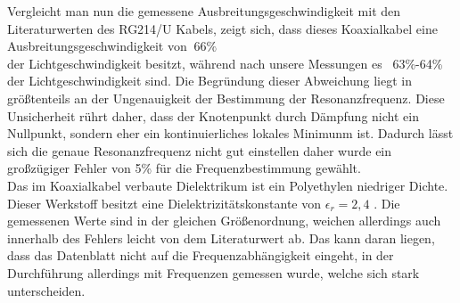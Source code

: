 \documentclass[a4paper,10pt,twocolumn]{scrartcl} %
\begin{document}
		\noindent Vergleicht man nun die gemessene Ausbreitungsgeschwindigkeit mit den Literaturwerten des RG214/U Kabels, zeigt sich, dass dieses Koaxialkabel
		eine Ausbreitungsgeschwindigkeit von $~66\%$\\ der Lichtgeschwindigkeit besitzt\cite{Koaxialkabel1}, während nach unsere Messungen es ~63\%-64\% der Lichtgeschwindigkeit
		sind. Die Begründung dieser Abweichung liegt in größtenteils an der Ungenauigkeit der Bestimmung der Resonanzfrequenz. Diese Unsicherheit rührt daher, 
		dass der Knotenpunkt durch Dämpfung nicht ein Nullpunkt, sondern eher ein kontinuierliches lokales Minimunm ist. Dadurch lässt sich die genaue Resonanzfrequenz 
		nicht gut einstellen daher wurde ein großzügiger Fehler von 5\% für die Frequenzbestimmung gewählt. \\
		Das im Koaxialkabel verbaute Dielektrikum ist ein Polyethylen niedriger Dichte. Dieser Werkstoff besitzt eine 
		Dielektrizitätskonstante von $\epsilon_r = 2,4$ \cite{Koaxialkabel2}.
		Die gemessenen Werte sind in der gleichen Größenordnung, weichen allerdings auch innerhalb des Fehlers leicht von dem Literaturwert ab.
		Das kann daran liegen, dass das Datenblatt \cite{Koaxialkabel2} nicht auf die Frequenzabhängigkeit eingeht, in der Durchführung allerdings
		mit Frequenzen gemessen wurde, welche sich stark unterscheiden.
\end{document}
